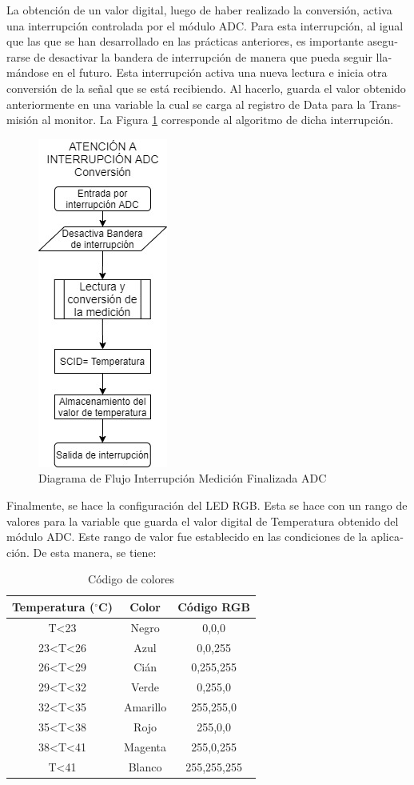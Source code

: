 \documentclass[journal]{IEEEtran}
\begin{document}
\begin{otherlanguage}{spanish}
La obtención de un valor digital, luego de haber realizado la conversión, activa una interrupción controlada por el módulo ADC. Para esta interrupción, al igual que las que se han desarrollado en las prácticas anteriores, es importante asegurarse de desactivar la bandera de interrupción de manera que pueda seguir llamándose en el futuro. Esta interrupción activa una nueva lectura e inicia otra conversión de la señal que se está recibiendo. Al hacerlo, guarda el valor obtenido anteriormente en una variable la cual se carga al registro de Data para la Transmisión al monitor. La Figura \ref{DDF_ADC} corresponde al algoritmo de dicha interrupción.

\begin{figure}[H]
    \centering
    \includegraphics[scale=.6]{Imágenes/Practica 5.6.jpg}
    \caption{Diagrama de Flujo Interrupción Medición Finalizada ADC}
    \label{DDF_ADC}
\end{figure}

Finalmente, se hace la configuración del LED RGB. Esta se hace con un rango de valores para la variable que guarda el valor digital de Temperatura obtenido del módulo ADC. Este rango de valor fue establecido en las condiciones de la aplicación. De esta manera, se tiene:

\begin{table}[H]
        \label{Salidas}
        \centering
        \caption{Código de colores}
        \begin{tabular}{||c||c||c||}
        \hline \hline 
        {\centering \textbf{Temperatura ($^{\circ}$C)}} & {\centering \textbf{Color}} & {\centering \textbf{Código RGB}} \tabularnewline \hline
         T<23 & Negro & 0,0,0 \tabularnewline \hline
         23<T<26 & Azul & 0,0,255 \tabularnewline \hline
         26<T<29 & Cián & 0,255,255 \tabularnewline \hline
         29<T<32 & Verde & 0,255,0 \tabularnewline \hline
         32<T<35 & Amarillo & 255,255,0 \tabularnewline \hline
         35<T<38 & Rojo & 255,0,0 \tabularnewline \hline
         38<T<41 & Magenta & 255,0,255 \tabularnewline \hline
         T<41 & Blanco & 255,255,255\tabularnewline \hline
        \hline 
        \end{tabular}
    \end{table}


\end{otherlanguage}
\end{document}
